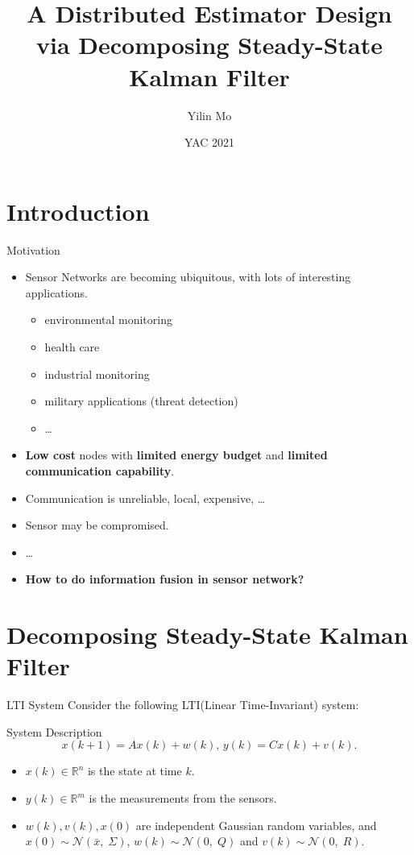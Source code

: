 \documentclass[10pt]{beamer}
\title[Kalman Filter]{A Distributed Estimator Design via Decomposing Steady-State Kalman Filter}
\author[Yilin Mo]{Yilin Mo}
\institute[Tsinghua]{Department of Automation, Tsinghua University}
\date[May 29, 2021]{YAC 2021}
\DeclareMathOperator{\1}{\textbf{1}}
\begin{document}
\begin{frame}
  \titlepage
\end{frame}


\section{Introduction}

\begin{frame}{Motivation}
  \begin{itemize}
    \item Sensor Networks are becoming ubiquitous, with lots of interesting applications.
      \begin{itemize}
	\item environmental monitoring
	\item health care
	\item industrial monitoring
	\item military applications (threat detection)
	\item \ldots
      \end{itemize}
    \item {\bf Low cost} nodes with {\bf limited energy budget} and {\bf limited communication capability}.
    \item Communication is unreliable, local, expensive, \ldots
    \item Sensor may be compromised.
    \item \ldots
    \item \bf How to do information fusion in sensor network?
  \end{itemize}
\end{frame}

\section{Decomposing Steady-State Kalman Filter }

\begin{frame}{LTI System}
  Consider the following LTI(Linear Time-Invariant) system:
  \begin{block}{System Description}
    \begin{displaymath}
	x(k+1) = A x(k) + w(k),\, y(k) = C x(k) + v(k).
    \end{displaymath}
  \end{block}
  \begin{itemize}
    \item $x(k) \in \mathbb R^n$ is the state at time $k$.
    \item  $y(k) \in \mathbb R^m$ is the measurements from the sensors. 
    \item $w(k),v(k),x(0)$ are independent Gaussian random variables, and $x(0) \sim \mathcal N(\bar x,\;\Sigma)$, $w(k) \sim \mathcal N(0,\;Q)$ and $v(k) \sim \mathcal N(0,\;R)$. 
  \end{itemize}
\end{frame}
\end{document}
